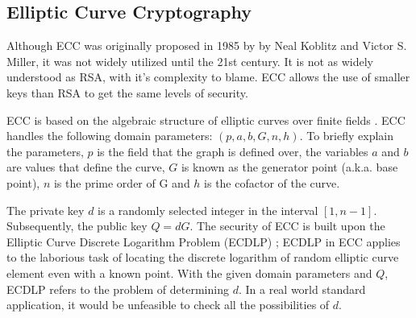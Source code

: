 \subsection{Elliptic Curve Cryptography}

Although ECC was originally proposed in 1985 by by Neal Koblitz and Victor S. Miller, it was not widely utilized until the 21st century. It is not as widely understood as RSA, with it's complexity to blame. ECC allows the use of smaller keys than RSA to get the same levels of security. 

ECC is based on the algebraic structure of elliptic curves over finite fields \cite{RSA_ECC}. ECC handles the following domain parameters: \((p,a,b,G,n,h)\). To briefly explain the parameters, \(p\) is the field that the graph is defined over, the variables \(a\) and \(b\) are values that define the curve, \(G\) is known as the generator point (a.k.a. base point), \(n\) is the prime order of G and \(h\) is the cofactor of the curve.

The private key \(d\) is a randomly selected integer in the interval \( [ 1 , n - 1 ]\). Subsequently, the public key \(Q=dG\). The security of ECC is built upon the Elliptic Curve Discrete Logarithm Problem (ECDLP) \cite{RSA_ECC}; ECDLP in ECC applies to the laborious task of locating the discrete logarithm of random elliptic curve element even with a known point. With the given domain parameters and \(Q\), ECDLP refers to the problem of determining \(d\). In a real world standard application, it would be unfeasible to check all the possibilities of \(d\).